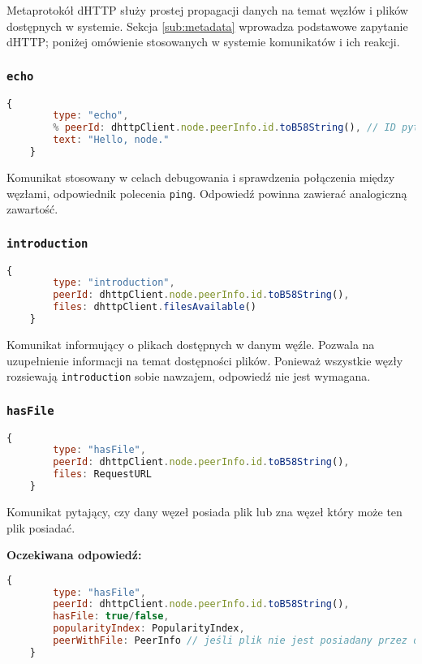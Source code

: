 Metaprotokół dHTTP służy prostej propagacji danych na temat węzłów i plików dostępnych w systemie. Sekcja \ref{sub:metadata} wprowadza podstawowe zapytanie dHTTP; poniżej omówienie stosowanych w systemie komunikatów i ich reakcji.

% 

\subsubsection{\texttt{echo}}
\begin{lstlisting}[language=javascript]
    {
        type: "echo",
        % peerId: dhttpClient.node.peerInfo.id.toB58String(), // ID pytającego
        text: "Hello, node."
    }
\end{lstlisting}

Komunikat stosowany w celach debugowania i sprawdzenia połączenia między węzłami, odpowiednik polecenia \texttt{ping}. Odpowiedź powinna zawierać analogiczną zawartość.

% 

\subsubsection{\texttt{introduction}}
\begin{lstlisting}[language=javascript]
    {
        type: "introduction",
        peerId: dhttpClient.node.peerInfo.id.toB58String(),
        files: dhttpClient.filesAvailable()
    }
\end{lstlisting}

Komunikat informujący o plikach dostępnych w danym węźle. Pozwala na uzupełnienie informacji na temat dostępności plików. Ponieważ wszystkie węzły rozsiewają \texttt{introduction} sobie nawzajem, odpowiedź nie jest wymagana.

% 

\subsubsection{\texttt{hasFile}}
\begin{lstlisting}[language=javascript]
    {
        type: "hasFile",
        peerId: dhttpClient.node.peerInfo.id.toB58String(),
        files: RequestURL
    }
\end{lstlisting}

Komunikat pytający, czy dany węzeł posiada plik lub zna węzeł który może ten plik posiadać.

\textbf{Oczekiwana odpowiedź:}
\begin{lstlisting}[language=javascript]
    {
        type: "hasFile",
        peerId: dhttpClient.node.peerInfo.id.toB58String(),
        hasFile: true/false,
        popularityIndex: PopularityIndex,
        peerWithFile: PeerInfo // jeśli plik nie jest posiadany przez dany węzeł, ale wie on o potencjalnym posiadaczu
    }
\end{lstlisting}

